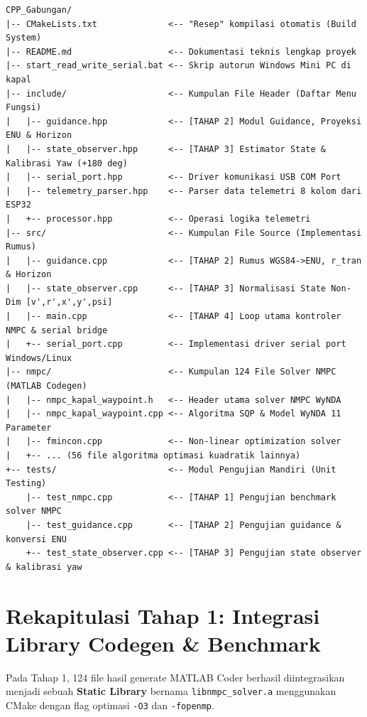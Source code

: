 \documentclass[11pt,a4paper]{article}
\begin{document}
\begin{lstlisting}[style=plainstyle, caption={Struktur Direktori Proyek CPP\_Gabungan Terkini}]
CPP_Gabungan/
|-- CMakeLists.txt              <-- "Resep" kompilasi otomatis (Build System)
|-- README.md                   <-- Dokumentasi teknis lengkap proyek
|-- start_read_write_serial.bat <-- Skrip autorun Windows Mini PC di kapal
|-- include/                    <-- Kumpulan File Header (Daftar Menu Fungsi)
|   |-- guidance.hpp            <-- [TAHAP 2] Modul Guidance, Proyeksi ENU & Horizon
|   |-- state_observer.hpp      <-- [TAHAP 3] Estimator State & Kalibrasi Yaw (+180 deg)
|   |-- serial_port.hpp         <-- Driver komunikasi USB COM Port
|   |-- telemetry_parser.hpp    <-- Parser data telemetri 8 kolom dari ESP32
|   +-- processor.hpp           <-- Operasi logika telemetri
|-- src/                        <-- Kumpulan File Source (Implementasi Rumus)
|   |-- guidance.cpp            <-- [TAHAP 2] Rumus WGS84->ENU, r_tran & Horizon
|   |-- state_observer.cpp      <-- [TAHAP 3] Normalisasi State Non-Dim [v',r',x',y',psi]
|   |-- main.cpp                <-- [TAHAP 4] Loop utama kontroler NMPC & serial bridge
|   +-- serial_port.cpp         <-- Implementasi driver serial port Windows/Linux
|-- nmpc/                       <-- Kumpulan 124 File Solver NMPC (MATLAB Codegen)
|   |-- nmpc_kapal_waypoint.h   <-- Header utama solver NMPC WyNDA
|   |-- nmpc_kapal_waypoint.cpp <-- Algoritma SQP & Model WyNDA 11 Parameter
|   |-- fmincon.cpp             <-- Non-linear optimization solver
|   +-- ... (56 file algoritma optimasi kuadratik lainnya)
+-- tests/                      <-- Modul Pengujian Mandiri (Unit Testing)
    |-- test_nmpc.cpp           <-- [TAHAP 1] Pengujian benchmark solver NMPC
    |-- test_guidance.cpp       <-- [TAHAP 2] Pengujian guidance & konversi ENU
    +-- test_state_observer.cpp <-- [TAHAP 3] Pengujian state observer & kalibrasi yaw
\end{lstlisting}

\section{Rekapitulasi Tahap 1: Integrasi Library Codegen \& Benchmark}

Pada Tahap 1, 124 file hasil generate MATLAB Coder berhasil diintegrasikan menjadi sebuah \textbf{Static Library} bernama \texttt{libnmpc\_solver.a} menggunakan CMake dengan flag optimasi \texttt{-O3} dan \texttt{-fopenmp}.
\end{document}
